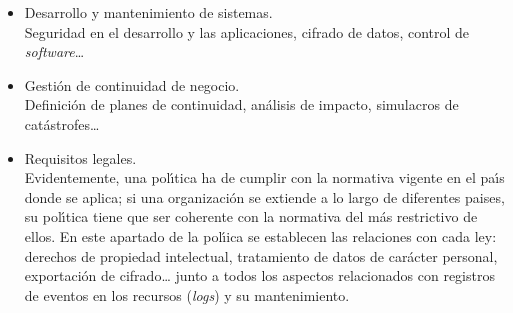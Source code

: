 \begin{itemize}
\item Desarrollo y mantenimiento de sistemas.\\
Seguridad en el desarrollo y las aplicaciones, cifrado de datos, control de
{\it software}\ldots
\item Gesti\'on de continuidad de negocio.\\
Definici\'on de planes de continuidad, an\'alisis de impacto, simulacros de
cat\'astrofes\ldots
\item Requisitos legales.\\
Evidentemente, una pol\'{\i}tica ha de cumplir con la normativa vigente en el
pa\'{\i}s donde se aplica; si una organizaci\'on se extiende a lo largo de
diferentes paises, su pol\'{\i}tica tiene que ser coherente con la normativa
del m\'as restrictivo de ellos. En este apartado de la pol\'{\i}ica se 
establecen las relaciones con cada ley: derechos de propiedad intelectual, 
tratamiento de datos de car\'acter personal, exportaci\'on de cifrado\ldots 
junto a todos los aspectos relacionados con registros de eventos en los 
recursos ({\it logs}) y su mantenimiento.
\end{itemize}
